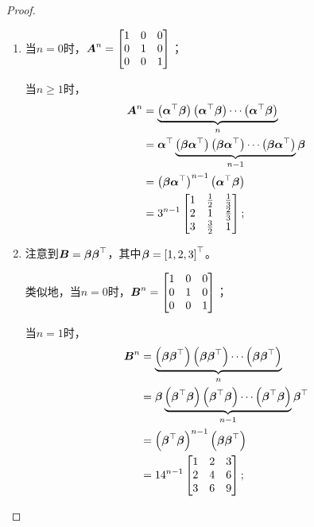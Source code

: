 \begin{proof}
    \begin{enumerate}
        \item 当\(n=0\)时，\(\boldsymbol{A}^n=\begin{bmatrix}1&0&0\\0&1&0\\0&0&1\end{bmatrix}\)；

              当\(n\ge1\)时，
              \begin{align*}
                  \boldsymbol{A}^n & =\underbrace{\left( \boldsymbol{\alpha}^\top\boldsymbol{\beta} \right)\left( \boldsymbol{\alpha}^\top\boldsymbol{\beta} \right)\cdots\left( \boldsymbol{\alpha}^\top\boldsymbol{\beta} \right)}_n                        \\
                          & =\boldsymbol{\alpha}^\top\underbrace{\left( \boldsymbol{\beta}\boldsymbol{\alpha}^\top \right)\left( \boldsymbol{\beta}\boldsymbol{\alpha}^\top \right)\cdots\left( \boldsymbol{\beta}\boldsymbol{\alpha}^\top \right)}_{n-1}\boldsymbol{\beta} \\
                          & =\left( \boldsymbol{\beta}\boldsymbol{\alpha}^\top \right)^{n-1}\left( \boldsymbol{\alpha}^\top\boldsymbol{\beta} \right)                                                                  \\
                          & =3^{n-1}\begin{bmatrix}
                                        1 & \frac{1}{2} & \frac{1}{3} \\
                                        2 & 1           & \frac{2}{3} \\
                                        3 & \frac{3}{2} & 1
                                    \end{bmatrix};
              \end{align*}
        \item 注意到\(\boldsymbol{B}=\boldsymbol{\beta}\boldsymbol{\beta}^\top\)，其中\(\boldsymbol{\beta}=\left[ 1,2,3 \right]^\top\)。

              类似地，当\(n=0\)时，\(\boldsymbol{B}^n=\begin{bmatrix}1&0&0\\0&1&0\\0&0&1\end{bmatrix}\)；

              当\(n=1\)时，
              \begin{align*}
                  \boldsymbol{B}^n & =\underbrace{\left( \boldsymbol{\beta}\boldsymbol{\beta}^\top \right)\left( \boldsymbol{\beta}\boldsymbol{\beta}^\top \right)\cdots\left( \boldsymbol{\beta}\boldsymbol{\beta}^\top \right)}_n                          \\
                          & =\boldsymbol{\beta}\underbrace{\left( \boldsymbol{\beta}^\top\boldsymbol{\beta} \right)\left( \boldsymbol{\beta}^\top\boldsymbol{\beta} \right)\cdots\left( \boldsymbol{\beta}^\top\boldsymbol{\beta} \right)}_{n-1}\boldsymbol{\beta}^\top \\
                          & =\left( \boldsymbol{\beta}^\top\boldsymbol{\beta} \right)^{n-1}\left( \boldsymbol{\beta}\boldsymbol{\beta}^\top \right)                                                                      \\
                          & ={14}^{n-1}
                  \begin{bmatrix}
                      1 & 2 & 3 \\
                      2 & 4 & 6 \\
                      3 & 6 & 9
                  \end{bmatrix};
              \end{align*}


\end{enumerate}
\end{proof}
